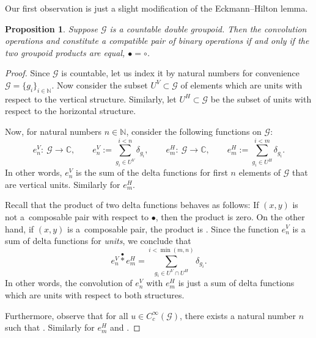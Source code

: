 \documentclass[10pt,a4paper]{amsart}
\numberwithin{equation}{section}
\newtheorem{Proposition}[Theorem]{Proposition}
\theoremstyle{definition}
\newcommand{\BBC}{\mathbb{C}}
\newcommand{\BBN}{\mathbb{N}}
\newcommand{\CG}{\mathcal{G}}
\newcommand{\stardot}{\overset{{\bullet}}{*}}
\newcommand{\starcirc}{\overset{\circ}{*}}
\begin{document}
Our first observation is just a slight modification of the Eckmann--Hilton lemma.
\begin{Proposition}
Suppose $ \CG $ is a countable double groupoid. Then the convolution operations \smash{$ \stardot $} and \smash{$ \starcirc $} constitute a compatible pair of binary operations if and only if the two groupoid products are equal, $ \bullet = \circ $.
\end{Proposition}
\begin{proof}
Since $ \CG $ is countable, let us index it by natural numbers for convenience
$\CG = \{ g_i \}_{i \in \BBN}$.
Now consider the subset $ U^V \subset \CG $ of elements which are units with respect to the vertical structure. Similarly, let $U^H \subset \CG $ be the subset of units with respect to the horizontal structure.

Now, for natural numbers $ n \in \BBN $, consider the following functions on $ \CG $:
\[
e_n^V \colon\ \CG \to \BBC, \qquad e_n^V := \sum\limits^{i<n}_{g_i \in U^V} \delta_{g_i},\qquad
e_m^H \colon\ \CG \to \BBC, \qquad e_m^H := \sum\limits^{i<m}_{g_i \in U^H} \delta_{g_i}.
\]
In other words, $ e^V_n $ is the sum of the delta functions for first $ n $ elements of $ \CG $ that are vertical units. Similarly for $ e^H_m$.

Recall that the product \smash{$ \delta_x \stardot \delta_y $} of two delta functions behaves as follows: If $ (x,y) $ is not a~composable pair with respect to $ \bullet $, then the product is zero. On the other hand, if $ (x,y) $ is a~composable pair, the product is \smash{$ \delta_x \stardot \delta_y = \delta_{x \bullet y} $}. Since the function $ e^V_n $ is a sum of delta functions for \emph{units}, we conclude that
\[
e^V_n \stardot e^H_m = \sum^{i < \min(m,n)}_{g_i \in U^V \cap U^H} \delta_{g_i}.
\]
In other words, the convolution of $ e^V_n $ with $ e^H_m$ is just a sum of delta functions which are units with respect to both structures.

Furthermore, observe that for all $ u \in C_c^\infty(\CG) $, there exists a natural number $ n $ such that
\smash{$e^V_n \starcirc u = u \starcirc e^V_n = u$}.
Similarly for $ e^H_m$ and \smash{$ \stardot $}.


\end{proof}
\end{document}
